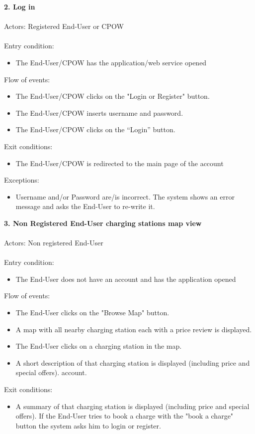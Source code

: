\documentclass[a4paper]{report}
\begin{document}
\textbf{2. Log in}\label{uc:1}
\\
\\
Actors: Registered End-User or CPOW\\ \\
Entry condition: 
\begin{itemize}
\item The End-User/CPOW has the application/web service opened
\end{itemize}
Flow of events:
\begin{itemize}
\item The End-User/CPOW clicks on the "Login or Register" button.
\item The End-User/CPOW inserts username and password. 
\item The End-User/CPOW clicks on the “Login” button.
\end{itemize}
Exit conditions: 
\begin{itemize}
\item The End-User/CPOW is redirected to the main page of the account 
\end{itemize}
Exceptions: 
\begin{itemize}
\item Username and/or Password are/is incorrect. The system shows an error message and asks the End-User to re-write it.
\end{itemize}
\textbf{3. Non Registered End-User charging stations map view}\label{uc:1}
\\
\\
Actors: Non registered End-User\\ \\
Entry condition: 
\begin{itemize}
\item The End-User does not have an account and has the application opened
\end{itemize}
Flow of events:
\begin{itemize}
\item The End-User clicks on the "Browse Map" button.
\item A map with all nearby charging station each with a price review is displayed.
\item The End-User clicks on a charging station in the map.
\item A short description of that charging station is displayed (including price and special offers).
 account.
\end{itemize}
Exit conditions: 
\begin{itemize}
\item A summary of that charging station is displayed (including price and special offers). If the End-User tries to book a charge with the "book a charge" button the system asks him to login or register. 
\end{itemize}
\end{document}
